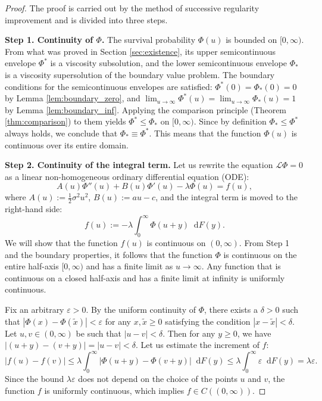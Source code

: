 \documentclass[smallextended]{svjour3}
\providecommand{\diff}{\mathop{}\!\mathrm{d}}
\begin{document}
\begin{proof}
The proof is carried out by the method of successive regularity improvement and is divided into three steps.

\textbf{Step 1. Continuity of $\Phi$.} The survival probability $\Phi(u)$ is bounded on $[0, \infty)$. From what was proved in Section \ref{sec:existence}, its upper semicontinuous envelope $\Phi^*$ is a viscosity subsolution, and the lower semicontinuous envelope $\Phi_*$ is a viscosity supersolution of the boundary value problem. The boundary conditions for the semicontinuous envelopes are satisfied: $\Phi^*(0) = \Phi_*(0) = 0$ by Lemma \ref{lem:boundary_zero}, and $\lim_{u \to \infty} \Phi^*(u) = \lim_{u \to \infty} \Phi_*(u) = 1$ by Lemma \ref{lem:boundary_inf}. Applying the comparison principle (Theorem \ref{thm:comparison}) to them yields $\Phi^* \le \Phi_*$ on $[0, \infty)$. Since by definition $\Phi_* \le \Phi^*$ always holds, we conclude that $\Phi_* \equiv \Phi^*$. This means that the function $\Phi(u)$ is continuous over its entire domain.

\textbf{Step 2. Continuity of the integral term.} Let us rewrite the equation $\mathcal{L}\Phi = 0$ as a linear non-homogeneous ordinary differential equation (ODE):
\begin{equation}
\label{eq:linearized_ode}
A(u)\Phi''(u) + B(u)\Phi'(u) - \lambda \Phi(u) = f(u),
\end{equation}
where $A(u) := \frac{1}{2}\sigma^2 u^2$, $B(u) := a u - c$, and the integral term is moved to the right-hand side:
$$ f(u) := -\lambda \int_0^\infty \Phi(u+y) \diff F(y). $$
We will show that the function $f(u)$ is continuous on $(0, \infty)$. From Step 1 and the boundary properties, it follows that the function $\Phi$ is continuous on the entire half-axis $[0, \infty)$ and has a finite limit as $u \to \infty$. Any function that is continuous on a closed half-axis and has a finite limit at infinity is uniformly continuous.

Fix an arbitrary $\varepsilon > 0$. By the uniform continuity of $\Phi$, there exists a $\delta > 0$ such that $|\Phi(x) - \Phi(\tilde{x})| < \varepsilon$ for any $x, \tilde{x} \ge 0$ satisfying the condition $|x - \tilde{x}| < \delta$. Let $u, v \in (0, \infty)$ be such that $|u - v| < \delta$. Then for any $y \ge 0$, we have $|(u+y) - (v+y)| = |u-v| < \delta$. Let us estimate the increment of $f$:
$$ |f(u) - f(v)| \le \lambda \int_0^\infty |\Phi(u+y) - \Phi(v+y)| \diff F(y) \le \lambda \int_0^\infty \varepsilon \diff F(y) = \lambda\varepsilon. $$
Since the bound $\lambda\varepsilon$ does not depend on the choice of the points $u$ and $v$, the function $f$ is uniformly continuous, which implies $f \in C((0, \infty))$.


\end{proof}
\end{document}
